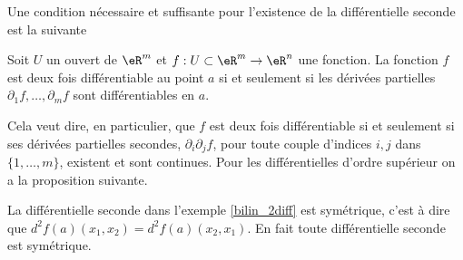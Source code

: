Une condition nécessaire et suffisante pour l'existence de la différentielle seconde est la suivante
\begin{proposition}
   Soit $U$ un ouvert de $\eR^m$ et  $f:U\subset\eR^m\to \eR^n$ une fonction. La fonction $f$ est deux fois différentiable au point $a$ si et seulement si les dérivées partielles $\partial_1 f, \ldots, \partial_m f $ sont différentiables en $a$. 
\end{proposition}
Cela veut dire, en particulier, que $f$ est deux fois différentiable si et seulement si ses dérivées partielles secondes, $\partial_i\partial_j f$, pour toute couple d'indices $i,j$  dans $\{1,\ldots, m\}$, existent et sont continues. Pour les différentielles d'ordre supérieur on a la proposition suivante.

La différentielle seconde dans l'exemple  \ref{bilin_2diff} est symétrique, c'est à dire que $d^2f(a)(x_1,x_2)=d^2f(a)(x_2,x_1)$. En fait toute différentielle seconde est symétrique.  


